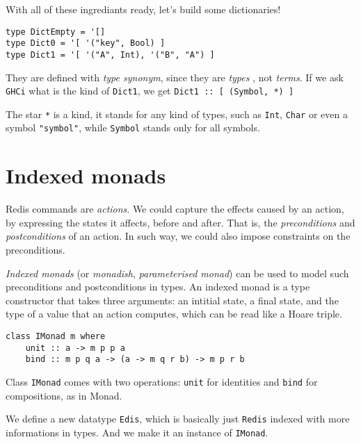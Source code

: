 \documentclass[pldi]{sigplanconf-pldi16}
\begin{document}
With all of these ingrediants ready, let's build some dictionaries!

\begin{verbatim}
type DictEmpty = '[]
type Dict0 = '[ '("key", Bool) ]
type Dict1 = '[ '("A", Int), '("B", "A") ]
\end{verbatim}

They are defined with \emph{type synonym}, since they are \emph{types}
, not \emph{terms}. If we ask \texttt{GHCi} what is the kind of
\texttt{Dict1}, we get \texttt{Dict1 :: [ (Symbol, *) ]}

The star \texttt{*} is a kind, it stands for any kind of types,
such as \texttt{Int}, \texttt{Char} or even a symbol
\texttt{"symbol"}, while \texttt{Symbol} stands only
for all symbols.

\section{Indexed monads}

Redis commands are \emph{actions}.
We could capture the effects caused by an action, by expressing the states it
affects, before and after. That is, the \emph{preconditions} and
\emph{postconditions} of an action. In such way, we could also impose
constraints on the preconditions.

\emph{Indexed monads} (or \emph{monadish},
\emph{parameterised monad})\cite{indexedmonad}
can be used\cite{typefun}\cite{staticresources} to model such preconditions and
postconditions in types. An indexed monad is a type constructor that takes three
arguments: an intitial state, a final state, and the type of a value that an
action computes, which can be read like a Hoare triple\cite{kleisli}.

\begin{verbatim}
class IMonad m where
    unit :: a -> m p p a
    bind :: m p q a -> (a -> m q r b) -> m p r b
\end{verbatim}

Class \texttt{IMonad} comes with two operations:
\texttt{unit} for identities and \texttt{bind} for
compositions, as in Monad.

We define a new datatype \texttt{Edis}, which is basically just
\texttt{Redis} indexed with more informations in types. And we make
 it an instance of \texttt{IMonad}.
\end{document}
